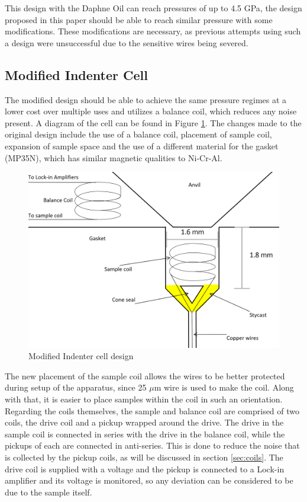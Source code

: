 \documentclass[11pt,onecolumn]{article}
\begin{document}
This design with the Daphne Oil can reach pressures  of up to 4.5 GPa\cite{IndenterCell}, the design proposed in this paper should be able to reach similar pressure with some modifications. These modifications are necessary, as previous attempts using such a design were unsuccessful due to the sensitive wires being severed.\\

\subsection{Modified Indenter Cell}

The modified design should be able to achieve the same pressure regimes at a lower cost over multiple uses and utilizes a balance coil, which reduces any noise present. A diagram of the cell can be found in Figure \ref{fig:2}. The changes made to the original design include the use of a balance coil, placement of sample coil, expansion of sample space and the use of a different material for the gasket (MP35N), which has similar magnetic qualities to Ni-Cr-Al.\cite{IndenterCell}\cite{MP35N_similarities}\\

\begin{figure}[ht]
	\centering
	\includegraphics[width=.6\columnwidth]{figures/Modified_Indenter_Cell_Design.png}
	\caption{Modified Indenter cell design}
	\label{fig:2}
\end{figure}

The new placement of the sample coil allows the wires to be better protected during setup of the apparatus, since 25 $\mu$m wire is used to make the coil. Along with that, it is easier to place samples within the coil in such an orientation. Regarding the coils themselves, the sample and balance coil are comprised of two coils, the drive coil and a pickup wrapped around the drive. The drive in the sample coil is connected in series with the drive in the balance coil, while the pickups of each are connected in anti-series. This is done to reduce the noise that is collected by the pickup coils, as will be discussed in section \ref{sec:coils}. The drive coil is supplied with a voltage and the pickup is connected to a Lock-in amplifier and its voltage is monitored, so any deviation can be considered to be due to the sample itself.\\
\end{document}

